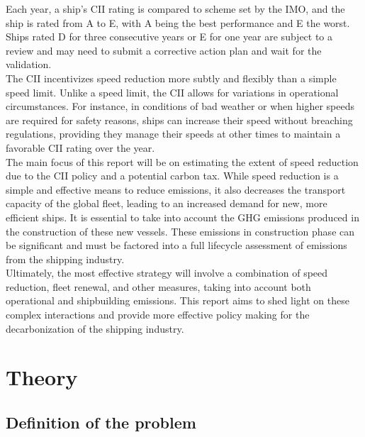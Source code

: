 \documentclass[a4paper,12pt]{article}
\begin{document}
Each year, a ship's CII rating is compared to scheme set by the IMO, and the ship is rated from A to E, with A being the best performance and E the worst.
Ships rated D for three consecutive years or E for one year are subject to a review and may need to submit a corrective action plan and wait for the validation.\\

The CII incentivizes speed reduction more subtly and flexibly than a simple speed limit. Unlike a speed limit, the CII allows for variations in operational circumstances.
For instance, in conditions of bad weather or when higher speeds are required for safety reasons, ships can increase their speed without breaching regulations, providing they manage their speeds at other times to maintain a favorable CII rating over the year.\\

The main focus of this report will be on estimating the extent of speed reduction due to the CII policy and a potential carbon tax.
While speed reduction is a simple and effective means to reduce emissions, it also decreases the transport capacity of the global fleet, leading to an increased demand for new, more efficient ships.
It is essential to take into account the GHG emissions produced in the construction of these new vessels.
These emissions in construction phase can be significant and must be factored into a full lifecycle assessment of emissions from the shipping industry.\\

Ultimately, the most effective strategy will involve a combination of speed reduction, fleet renewal, and other measures, taking into account both operational and shipbuilding emissions.
This report aims to shed light on these complex interactions and provide more effective policy making for the decarbonization of the shipping industry.


\newpage
\section{Theory}

\subsection{Definition of the problem}
\end{document}
